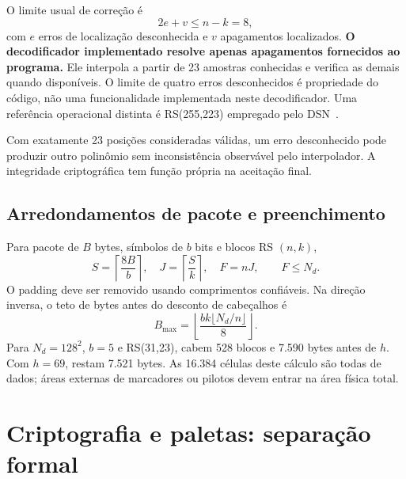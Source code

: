 \documentclass[11pt,a4paper]{article}
\begin{document}
O limite usual de correção é
\begin{equation}\label{eq:rsbound}
2e+v\le n-k=8,
\end{equation}
com $e$ erros de localização desconhecida e $v$ apagamentos localizados. \textbf{O decodificador implementado resolve apenas apagamentos fornecidos ao programa.} Ele interpola a partir de 23 amostras conhecidas e verifica as demais quando disponíveis. O limite de quatro erros desconhecidos é propriedade do código, não uma funcionalidade implementada neste decodificador. Uma referência operacional distinta é RS(255,223) empregado pelo DSN~\cite{2023jplTelemetry}.

Com exatamente 23 posições consideradas válidas, um erro desconhecido pode produzir outro polinômio sem inconsistência observável pelo interpolador. A integridade criptográfica tem função própria na aceitação final.

\subsection{Arredondamentos de pacote e preenchimento}
Para pacote de $B$ bytes, símbolos de $b$ bits e blocos RS $(n,k)$,
\begin{equation}
S=\left\lceil\frac{8B}{b}\right\rceil,\quad
J=\left\lceil\frac{S}{k}\right\rceil,\quad
F=nJ,\qquad F\le N_d.
\end{equation}
O padding deve ser removido usando comprimentos confiáveis. Na direção inversa, o teto de bytes antes do desconto de cabeçalhos é
\begin{equation}\label{eq:finite}
B_{\max}=\left\lfloor\frac{bk\lfloor N_d/n\rfloor}{8}\right\rfloor.
\end{equation}
Para $N_d=128^2$, $b=5$ e RS(31,23), cabem 528 blocos e 7.590 bytes antes de $h$. Com $h=69$, restam 7.521 bytes. As 16.384 células deste cálculo são todas de dados; áreas externas de marcadores ou pilotos devem entrar na área física total.

\section{Criptografia e paletas: separação formal}
\end{document}
